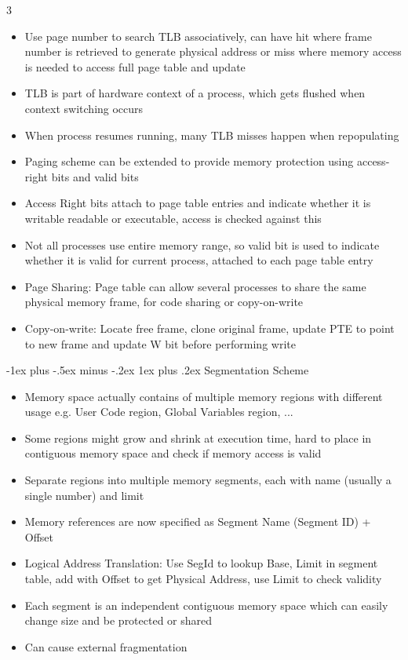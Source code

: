 \documentclass[10pt, landscape]{article}
\makeatletter
\renewcommand{\subsection}{\@startsection{subsection}{3}{0mm}%
                                {-1ex plus -.5ex minus -.2ex}%
                                {1ex plus .2ex}%
                                {\normalfont\small\bfseries}}%
\makeatother
\begin{document}
\begin{multicols*}{3}
\begin{itemize}
    \item Use page number to search TLB associatively, can have hit where frame number is retrieved to generate physical address or miss where memory access is needed to access full page table and update
    \item TLB is part of hardware context of a process, which gets flushed when context switching occurs
    \item When process resumes running, many TLB misses happen when repopulating
    \item Paging scheme can be extended to provide memory protection using access-right bits and valid bits
    \item Access Right bits attach to page table entries and indicate whether it is writable readable or executable, access is checked against this
    \item Not all processes use entire memory range, so valid bit is used to indicate whether it is valid for current process, attached to each page table entry
    \item Page Sharing: Page table can allow several processes to share the same physical memory frame, for code sharing or copy-on-write
    \item Copy-on-write: Locate free frame, clone original frame, update PTE to point to new frame and update W bit before performing write
\end{itemize}

\subsection{Segmentation Scheme}
\begin{itemize}
    \item Memory space actually contains of multiple memory regions with different usage e.g. User Code region, Global Variables region, ...
    \item Some regions might grow and shrink at execution time, hard to place in contiguous memory space and check if memory access is valid
    \item Separate regions into multiple memory segments, each with name (usually a single number) and limit
    \item Memory references are now specified as Segment Name (Segment ID) + Offset 
    \item Logical Address Translation: Use SegId to lookup Base, Limit in segment table, add with Offset to get Physical Address, use Limit to check validity
    \item Each segment is an independent contiguous memory space which can easily change size and be protected or shared
    \item Can cause external fragmentation
\end{itemize}


\end{multicols*}
\end{document}
